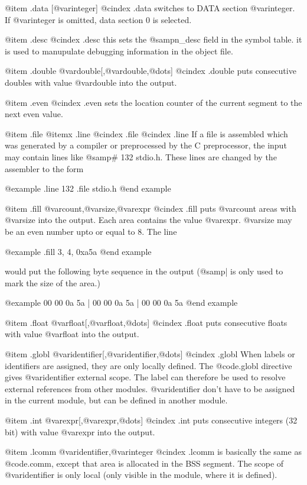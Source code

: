 {{{{{@item .data [@var{integer}]
@cindex .data
switches to DATA section @var{integer}. If @var{integer} is omitted,
data section 0 is selected.

@item .desc
@cindex .desc
this sets the @samp{n_desc} field in the symbol table. it is used to manupulate
debugging information in the object file.

@item .double @var{double}[,@var{double},@dots{}]
@cindex .double
puts consecutive doubles with value @var{double} into the output.

@item .even
@cindex .even
sets the location counter of the current segment to the next even
value.

@item .file
@itemx .line
@cindex .file
@cindex .line
If a file is assembled which was generated by a compiler or preprocessed
by the C preprocessor, the input may contain lines like @samp{# 132 stdio.h}.
These lines are changed by the assembler to the form

@example
.line 132
.file stdio.h
@end example

@item .fill @var{count},@var{size},@var{expr}
@cindex .fill
puts @var{count} areas with @var{size} into the output. Each area
contains the value @var{expr}. @var{size} may be an even number upto or
equal to 8. The line 

@example
.fill 3, 4, 0xa5a
@end example

would put the following byte sequence in the output (@samp{|} is only
used to mark the size of the area.)

@example
00 00 0a 5a | 00 00 0a 5a | 00 00 0a 5a 
@end example

@item .float @var{float}[,@var{float},@dots{}]
@cindex .float
puts consecutive floats with value @var{float} into the output.

@item .globl @var{identifier}[,@var{identifier},@dots{}]
@cindex .globl
When labels or identifiers are assigned, they are only locally defined.
The @code{.globl} directive gives @var{identifier} external scope. The
label can therefore be used to resolve external references from other
modules. @var{identifier} don't have to be assigned in the current 
module, but can be defined in another module.

@item .int @var{expr}[,@var{expr},@dots{}]
@cindex .int
puts consecutive integers (32 bit) with value @var{expr} into the output.

@item .lcomm @var{identifier},@var{integer}
@cindex .lcomm
is basically the same as @code{.comm}, except that area is allocated in
the BSS segment. The scope of @var{identifier} is only local (only 
visible in the module, where it is defined).

}}}}}
